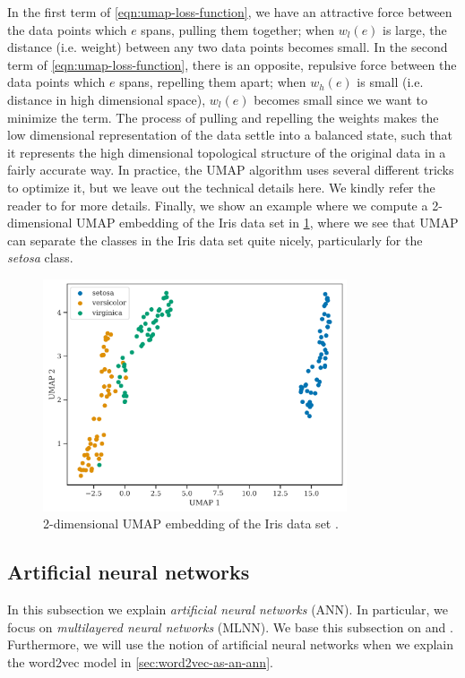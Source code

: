 In the first term of \cref{eqn:umap-loss-function}, we have an attractive force between the data points which $e$ spans, pulling them together; when $w_l(e)$ is large, the distance (i.e. weight) between any two data points becomes small. In the second term of \cref{eqn:umap-loss-function}, there is an opposite, repulsive force between the data points which $e$ spans, repelling them apart; when $w_h(e)$ is small (i.e. distance in high dimensional space), $w_l(e)$ becomes small since we want to minimize the term. The process of pulling and repelling the weights makes the low dimensional representation of the data settle into a balanced state, such that it represents the high dimensional topological structure of the original data in a fairly accurate way. In practice, the UMAP algorithm uses several different tricks to optimize it, but we leave out the technical details here. We kindly refer the reader to \cite{2018arXivUMAP} for more details. Finally, we show an example where we compute a 2-dimensional UMAP embedding of the Iris data set \cite{Anderson1936,Fisher1936} in \cref{fig:umap-2d-example}, where we see that UMAP can separate the classes in the Iris data set quite nicely, particularly for the \textit{setosa} class.
\begin{figure}[H]
    \centering
    \includegraphics[width=0.8\textwidth]{thesis/figures/umap-2d-example.pdf}
    \caption{2-dimensional UMAP embedding of the Iris data set \cite{Anderson1936,Fisher1936}.}
    \label{fig:umap-2d-example}
\end{figure}

\subsection{Artificial neural networks}
\label{sec:artificial-neural-networks}
In this subsection we explain \textit{artificial neural networks} (ANN). In particular, we focus on \textit{multilayered neural networks} (MLNN). We base this subsection on \cite[Chapter 1]{Aggarwal18} and \cite{rong2016word2vec}. Furthermore, we will use the notion of artificial neural networks when we explain the word2vec model in \cref{sec:word2vec-as-an-ann}.

